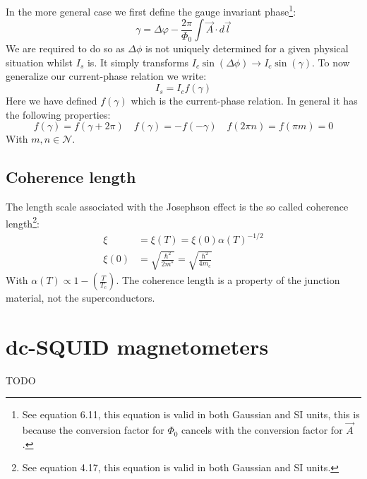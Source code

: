 In the more general case we first define the gauge invariant phase\footnote{See  equation 6.11, this equation is valid in both Gaussian and SI units, this is because the conversion factor for $\Phi_0$ cancels with the conversion factor for $\vec{A}$.}:
\begin{equation}
	\gamma = \Delta \varphi - \frac{2\pi}{\Phi_0}\int \vec{A} \cdot d\vec{l}
	\label{eqn:gauge-invariant-phase}
\end{equation}
We are required to do so as $\Delta \phi$ is not uniquely determined for a given physical situation whilst $I_s$ is\cite{tinkhamIntroductionSuperconductivity}. It simply transforms $I_c \sin(\Delta \phi) \to I_c \sin(\gamma)$. To now generalize our current-phase relation we write:
\begin{equation}
	I_s = I_c f(\gamma)
\end{equation}
Here we have defined $f(\gamma)$ which is the current-phase relation. In general it has the following properties\cite{golubovCurrentphaseRelationJosephson2004a}:
\begin{equation}
	f(\gamma) = f(\gamma + 2\pi) \quad f(\gamma) = -f(-\gamma) \quad f(2\pi n) = f(\pi m) = 0
\end{equation}
With $m,n \in \mathcal{N}$.

\subsection{Coherence length}
The length scale associated with the Josephson effect is the so called coherence length\footnote{See  equation 4.17, this equation is valid in both Gaussian and SI units.}\cite{tinkhamIntroductionSuperconductivity}:
\begin{align}
	\xi &= \xi(T) = \xi(0)\alpha(T)^{-1/2} \nonumber \\
	\xi(0) &= \sqrt{\frac{\hbar^2}{2m^*}} = \sqrt{\frac{\hbar^2}{4m_e}}
\end{align}
With $\alpha(T) \propto 1 - \left(\frac{T}{T_c}\right)$. The coherence length is a property of the junction material, not the superconductors.

\section{dc-SQUID magnetometers}
TODO